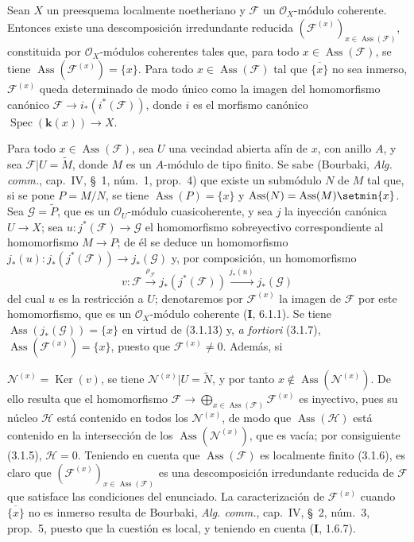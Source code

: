 \begin{proposition}[3.2.6]
\label{IV.2.3.2.6-fr}
Sean $X$ un preesquema localmente noetheriano y $\mathcal F$ un
$\mathcal O_X$-módulo coherente. Entonces existe una descomposición
irredundante reducida
$(\mathcal F^{(x)})_{x\in\operatorname{Ass}(\mathcal F)}$, constituida por
$\mathcal O_X$-módulos coherentes tales que, para todo
$x\in\operatorname{Ass}(\mathcal F)$, se tiene
$\operatorname{Ass}(\mathcal F^{(x)})=\{x\}$. Para todo
$x\in\operatorname{Ass}(\mathcal F)$ tal que $\overline{\{x\}}$ no sea
inmerso, $\mathcal F^{(x)}$ queda determinado de modo único como la imagen del
homomorfismo canónico $\mathcal F\to i_*(i^*(\mathcal F))$, donde $i$ es el
morfismo canónico $\operatorname{Spec}(\boldsymbol{k}(x))\to X$.
\end{proposition}

Para todo $x\in\operatorname{Ass}(\mathcal F)$, sea $U$ una vecindad abierta
afín de $x$, con anillo $A$, y sea $\mathcal F|U=\widetilde M$, donde $M$ es
un $A$-módulo de tipo finito. Se sabe (Bourbaki, \emph{Alg. comm.}, cap.~IV,
\S~1, núm.~1, prop.~4) que existe un submódulo $N$ de $M$ tal que, si se pone
$P=M/N$, se tiene $\operatorname{Ass}(P)=\{x\}$ y
$\operatorname{Ass}(N)=\operatorname{Ass}(M)\setmin\{x\}$. Sea
$\mathcal G=\widetilde P$, que es un $\mathcal O_U$-módulo cuasicoherente, y
sea $j$ la inyección canónica $U\to X$; sea
$u:j^*(\mathcal F)\to\mathcal G$ el homomorfismo sobreyectivo correspondiente
al homomorfismo $M\to P$; de él se deduce un homomorfismo
$j_*(u):j_*(j^*(\mathcal F))\to j_*(\mathcal G)$ y, por composición, un
homomorfismo
\[
v:\mathcal F\xrightarrow{\rho_{\mathcal F}}j_*(j^*(\mathcal F))
\xrightarrow{j_*(u)}j_*(\mathcal G)
\]
del cual $u$ es la restricción a $U$; denotaremos por
$\mathcal F^{(x)}$ la imagen de $\mathcal F$ por este homomorfismo, que es un
$\mathcal O_X$-módulo coherente
(\textbf I, 6.1.1). Se tiene $\operatorname{Ass}(j_*(\mathcal G))=\{x\}$ en virtud de
(3.1.13) y, \emph{a fortiori} (3.1.7),
$\operatorname{Ass}(\mathcal F^{(x)})=\{x\}$, puesto que
$\mathcal F^{(x)}\ne0$. Además, si

$\mathcal N^{(x)}=\operatorname{Ker}(v)$, se tiene
$\mathcal N^{(x)}|U=\widetilde N$, y por tanto
$x\notin\operatorname{Ass}(\mathcal N^{(x)})$. De ello resulta que el
homomorfismo
$\mathcal F\to\bigoplus_{x\in\operatorname{Ass}(\mathcal F)}
\mathcal F^{(x)}$ es inyectivo, pues su núcleo $\mathcal H$ está contenido en
todos los $\mathcal N^{(x)}$, de modo que $\operatorname{Ass}(\mathcal H)$
está contenido en la intersección de los
$\operatorname{Ass}(\mathcal N^{(x)})$, que es vacía; por consiguiente (3.1.5),
$\mathcal H=0$. Teniendo en cuenta que
$\operatorname{Ass}(\mathcal F)$ es localmente finito (3.1.6), es claro que
$(\mathcal F^{(x)})_{x\in\operatorname{Ass}(\mathcal F)}$ es una
descomposición irredundante reducida de $\mathcal F$ que satisface las
condiciones del enunciado. La caracterización de $\mathcal F^{(x)}$ cuando
$\overline{\{x\}}$ no es inmerso resulta de Bourbaki,
\emph{Alg. comm.}, cap.~IV, \S~2, núm.~3, prop.~5, puesto que la cuestión es
local, y teniendo en cuenta (\textbf I, 1.6.7).
